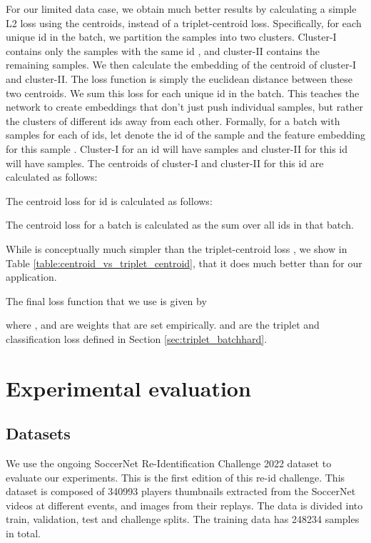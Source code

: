 \documentclass{article}
\begin{document}
For our limited data case, we obtain much better results by calculating a simple L2 loss using the centroids, instead of a triplet-centroid loss. Specifically, for each unique id  in the batch, we partition the samples into two clusters. Cluster-I contains only the samples with the same id , and cluster-II contains the remaining samples. We then calculate the embedding of the centroid of cluster-I and cluster-II. The loss function is simply the euclidean distance between these two centroids. We sum this loss for each unique id in the batch. This teaches the network to create embeddings that don't just push individual samples, but rather the clusters of different ids away from each other. Formally, for a batch with  samples for each of  ids, let  denote the id of the sample  and  the feature embedding for this sample . Cluster-I for an id  will have  samples and cluster-II for this id will have  samples. The centroids of cluster-I and cluster-II for this id  are calculated as follows:


The centroid loss for id  is calculated as follows:



The centroid loss for a batch is calculated as the sum over all ids in that batch.


While  is conceptually much simpler than the triplet-centroid loss , we show in Table \ref{table:centroid_vs_triplet_centroid}, that it does much better than  for our application.

The final loss function that we use is given by

where ,  and  are weights that are set empirically.  and  are the triplet and classification loss defined in Section \ref{sec:triplet_batchhard}.

\section{Experimental evaluation}
\label{sec:evaluation}
\subsection{Datasets}
\label{sec:datasets}

We use the ongoing SoccerNet Re-Identification Challenge 2022 dataset \cite{soccerNetv3, soccerNetv2} to evaluate our experiments. This is the first edition of this re-id challenge. This dataset is composed of 340993 players thumbnails extracted from the SoccerNet videos at different events, and images from their replays. The data is divided into train, validation, test and challenge splits. The training data has 248234 samples in total. 
\end{document}
